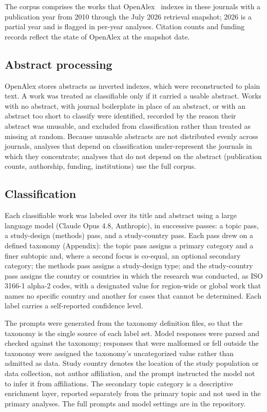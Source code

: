 The corpus comprises the works that OpenAlex~\cite{openalex} indexes in these
journals with a publication year from 2010 through the July 2026 retrieval
snapshot; 2026 is a partial year and is flagged in per-year analyses. Citation
counts and funding records reflect the state of OpenAlex at the snapshot date.

\subsection{Abstract processing}

OpenAlex stores abstracts as inverted indexes, which were reconstructed to
plain text. A work was treated as classifiable only if it carried a usable
abstract. Works with no abstract, with journal boilerplate in place of an
abstract, or with an abstract too short to classify were identified, recorded
by the reason their abstract was unusable, and excluded from classification
rather than treated as missing at random. Because unusable abstracts are not
distributed evenly across journals, analyses that depend on classification
under-represent the journals in which they concentrate; analyses that do not
depend on the abstract (publication counts, authorship, funding, institutions)
use the full corpus.

\subsection{Classification}

Each classifiable work was labeled over its title and abstract using a large
language model (Claude Opus 4.8, Anthropic), in successive passes: a topic
pass, a study-design (methods) pass, and a study-country pass. Each pass drew
on a defined taxonomy (Appendix): the topic pass assigns a primary category and
a finer subtopic and, where a second focus is co-equal, an optional secondary
category; the methods pass assigns a study-design type; and the study-country
pass assigns the country or countries in which the research was conducted, as
ISO 3166-1 alpha-2 codes, with a designated value for region-wide or global
work that names no specific country and another for cases that cannot be
determined. Each label carries a self-reported confidence level.

The prompts were generated from the taxonomy definition files, so that the
taxonomy is the single source of each label set. Model responses were parsed
and checked against the taxonomy; responses that were malformed or fell outside
the taxonomy were assigned the taxonomy's uncategorized value rather than
admitted as data. Study country denotes the location of the study population or
data collection, not author affiliation, and the prompt instructed the model
not to infer it from affiliations. The secondary topic category is a
descriptive enrichment layer, reported separately from the primary topic and
not used in the primary analyses. The full prompts and model settings are in
the repository.

